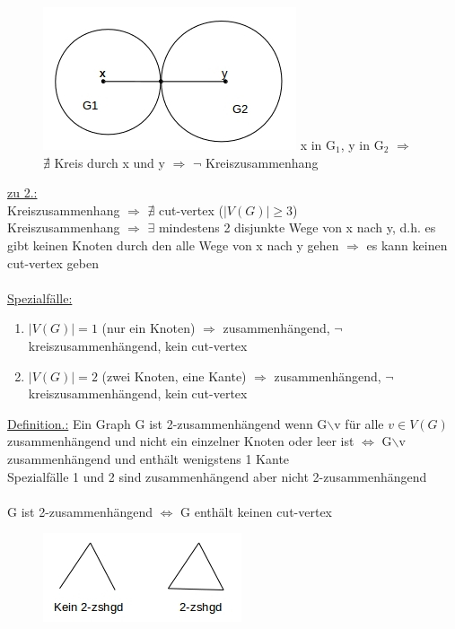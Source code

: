 \begin{figure}[htp]
\centering
\includegraphics[scale=0.9]{lectures/161021/pix/pic5.jpg}
x in G$_1$, y in G$_2$ $\Rightarrow$ $\nexists$ Kreis durch x und y $\Rightarrow$ $\neg$ Kreiszusammenhang
\end{figure}

\newpage
\underline{zu 2.:}\\
Kreiszusammenhang $\Rightarrow$ $\nexists$ cut-vertex ($|V(G)| \geq 3$)\\
Kreiszusammenhang $\Rightarrow$ $\exists$ mindestens 2 disjunkte Wege von x nach y, d.h. es gibt keinen Knoten durch den alle Wege von x nach y gehen $\Rightarrow$ es kann keinen cut-vertex geben
\\\\
\underline{Spezialfälle:}\\
\begin{enumerate}
	\item $|V(G)| = 1$ (nur ein Knoten) $\Rightarrow$ zusammenhängend, $\neg$ kreiszusammenhängend, kein cut-vertex
	\item $|V(G)| = 2$ (zwei Knoten, eine Kante) $\Rightarrow$ zusammenhängend, $\neg$ kreiszusammenhängend, kein cut-vertex
\end{enumerate}

\underline{Definition.:} Ein Graph G ist 2-zusammenhängend wenn G$\backslash$v für alle $v \in V(G)$ zusammenhängend und nicht ein einzelner Knoten oder leer ist $\Leftrightarrow$ G$\backslash$v zusammenhängend und enthält wenigstens 1 Kante\\

Spezialfälle 1 und 2 sind zusammenhängend aber nicht 2-zusammenhängend
\\\\
G ist 2-zusammenhängend $\Leftrightarrow$ G enthält keinen cut-vertex
\begin{figure}[htp]
\centering
\includegraphics[scale=0.9]{lectures/161021/pix/pic6.jpg}
\end{figure}

